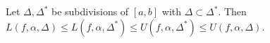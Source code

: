Let $\Delta, \Delta^*$ be subdivisions of $[a, b]$ with $\Delta \subset \Delta^*$. Then $L(f,\alpha,\Delta) \leq L(f,\alpha,\Delta^*) \leq U(f,\alpha,\Delta^*) \leq U(f,\alpha,\Delta)$.
